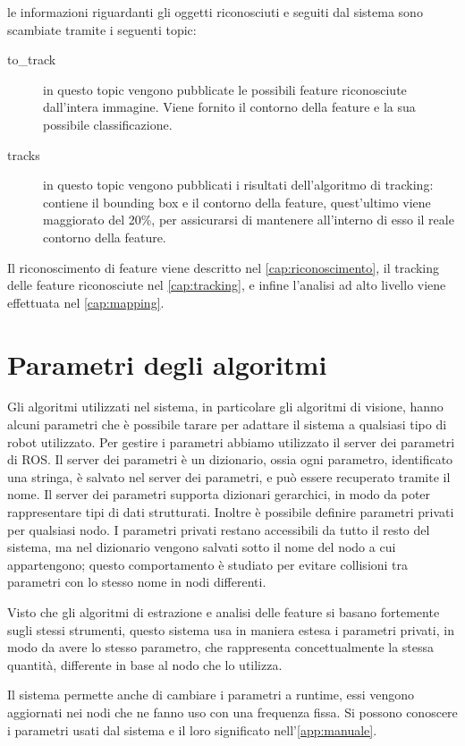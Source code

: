 le informazioni riguardanti gli oggetti riconosciuti e seguiti dal sistema sono scambiate tramite i seguenti topic:

\begin{description}
 \item [\/to\_track] in questo topic vengono pubblicate le possibili feature riconosciute dall'intera immagine. Viene fornito il contorno della feature e la sua possibile classificazione.
 \item [\/tracks] in questo topic vengono pubblicati i risultati dell'algoritmo di tracking: contiene il bounding box e il contorno della feature, quest'ultimo viene maggiorato del 20\%, per assicurarsi di mantenere all'interno di esso il reale contorno della feature.
\end{description}

Il riconoscimento di feature viene descritto nel \autoref{cap:riconoscimento}, il tracking delle feature riconosciute nel \autoref{cap:tracking}, e infine l'analisi ad alto livello viene effettuata nel \autoref{cap:mapping}.

\section{Parametri degli algoritmi}

Gli algoritmi utilizzati nel sistema, in particolare gli algoritmi di visione, hanno alcuni parametri che è possibile tarare per adattare il sistema a qualsiasi tipo di robot utilizzato.
Per gestire i parametri abbiamo utilizzato il server dei parametri di ROS.
Il server dei parametri è un dizionario, ossia ogni parametro, identificato una stringa, è salvato nel server dei parametri, e può essere recuperato tramite il nome. 
Il server dei parametri supporta dizionari gerarchici, in modo da poter rappresentare tipi di dati strutturati. 
Inoltre è possibile definire parametri privati per qualsiasi nodo. I parametri privati restano accessibili da tutto il resto del sistema, ma nel dizionario vengono salvati sotto il nome del nodo a cui appartengono; questo comportamento è studiato per evitare collisioni tra parametri con lo stesso nome in nodi differenti.

Visto che gli algoritmi di estrazione e analisi delle feature si basano fortemente sugli stessi strumenti, questo sistema usa in maniera estesa i parametri privati, in modo da avere lo stesso parametro, che rappresenta concettualmente la stessa quantità, differente in base al nodo che lo utilizza.

Il sistema permette anche di cambiare i parametri a runtime, essi vengono aggiornati nei nodi che ne fanno uso con una frequenza fissa.
Si possono conoscere i parametri usati dal sistema e il loro significato nell'\autoref{app:manuale}.




